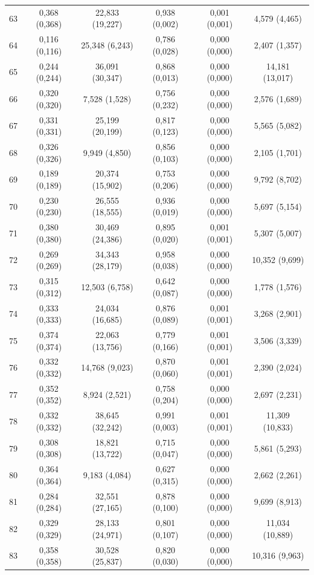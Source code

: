 \begin{tabular}{l c c c c c}
63 & 0,368 (0,368) & 22,833 (19,227) & 0,938 (0,002) & 0,001 (0,001) & 4,579 (4,465) \\
64 & 0,116 (0,116) & 25,348 (6,243) & 0,786 (0,028) & 0,000 (0,000) & 2,407 (1,357) \\
65 & 0,244 (0,244) & 36,091 (30,347) & 0,868 (0,013) & 0,000 (0,000) & 14,181 (13,017) \\
66 & 0,320 (0,320) & 7,528 (1,528) & 0,756 (0,232) & 0,000 (0,000) & 2,576 (1,689) \\
67 & 0,331 (0,331) & 25,199 (20,199) & 0,817 (0,123) & 0,000 (0,000) & 5,565 (5,082) \\
68 & 0,326 (0,326) & 9,949 (4,850) & 0,856 (0,103) & 0,000 (0,000) & 2,105 (1,701) \\
69 & 0,189 (0,189) & 20,374 (15,902) & 0,753 (0,206) & 0,000 (0,000) & 9,792 (8,702) \\
70 & 0,230 (0,230) & 26,555 (18,555) & 0,936 (0,019) & 0,000 (0,000) & 5,697 (5,154) \\
71 & 0,380 (0,380) & 30,469 (24,386) & 0,895 (0,020) & 0,001 (0,001) & 5,307 (5,007) \\
72 & 0,269 (0,269) & 34,343 (28,179) & 0,958 (0,038) & 0,000 (0,000) & 10,352 (9,699) \\
73 & 0,315 (0,312) & 12,503 (6,758) & 0,642 (0,087) & 0,000 (0,000) & 1,778 (1,576) \\
74 & 0,333 (0,333) & 24,034 (16,685) & 0,876 (0,089) & 0,001 (0,001) & 3,268 (2,901) \\
75 & 0,374 (0,374) & 22,063 (13,756) & 0,779 (0,166) & 0,001 (0,001) & 3,506 (3,339) \\
76 & 0,332 (0,332) & 14,768 (9,023) & 0,870 (0,060) & 0,001 (0,001) & 2,390 (2,024) \\
77 & 0,352 (0,352) & 8,924 (2,521) & 0,758 (0,204) & 0,000 (0,000) & 2,697 (2,231) \\
78 & 0,332 (0,332) & 38,645 (32,242) & 0,991 (0,003) & 0,001 (0,001) & 11,309 (10,833) \\
79 & 0,308 (0,308) & 18,821 (13,722) & 0,715 (0,047) & 0,000 (0,000) & 5,861 (5,293) \\
80 & 0,364 (0,364) & 9,183 (4,084) & 0,627 (0,315) & 0,000 (0,000) & 2,662 (2,261) \\
81 & 0,284 (0,284) & 32,551 (27,165) & 0,878 (0,100) & 0,000 (0,000) & 9,699 (8,913) \\
82 & 0,329 (0,329) & 28,133 (24,971) & 0,801 (0,107) & 0,000 (0,000) & 11,034 (10,889) \\
83 & 0,358 (0,358) & 30,528 (25,837) & 0,820 (0,030) & 0,000 (0,000) & 10,316 (9,963) \\

\end{tabular}
